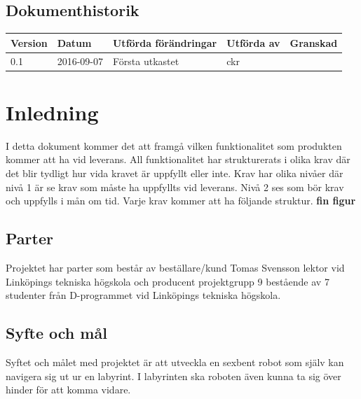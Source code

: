 \documentclass[a4paper,titlepage,12pt]{article}
\begin{document}
\begin{center}
		\section*{Dokumenthistorik}
		\begin{table}[h]
			\begin{tabular}[pos]{| l | l | l | l | l |}
				\hline
				\textbf{Version} & \textbf{Datum} & \textbf{Utförda förändringar} 
				& \textbf{Utförda av} & \textbf{Granskad} \\ \hline

				0.1 & 2016-09-07 & Första utkastet & ckr & \\ \hline

			\end{tabular}
		\end{table}

	\end{center}


	\newpage

	\section{Inledning}
	I detta dokument kommer det att framgå vilken funktionalitet som produkten kommer 
	att ha vid leverans. All funktionalitet har strukturerats i olika krav där det 
	blir tydligt hur vida kravet är uppfyllt eller inte. Krav har olika nivåer där
	nivå 1 är se krav som måste ha uppfyllts vid leverans. Nivå 2 ses som bör krav 
	och uppfylls i mån om tid. Varje krav kommer att ha följande struktur. 
	\textbf{fin figur}

	\subsection{Parter}
	Projektet har parter som består av beställare/kund Tomas Svensson lektor vid 
	Linköpings tekniska högskola och producent projektgrupp 9 bestående av 7 
	studenter från D-programmet vid Linköpings tekniska högskola. 
	\subsection{Syfte och mål}
	Syftet och målet med projektet är att utveckla en sexbent robot som själv
	kan navigera sig ut ur en labyrint. I labyrinten ska roboten även kunna ta 
	sig över hinder för att komma vidare. 
\end{document}
